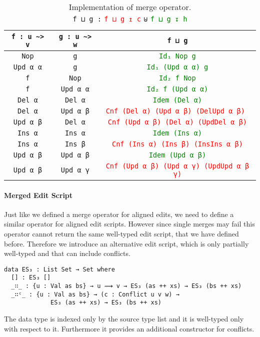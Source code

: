 \documentclass[preprint]{sigplanconf}
\theoremstyle{plain}
\begin{document}
	\begin{table*}[t]
	\centering
	\begin{tabular}{| c | c | c |}
	\hline
	\texttt{f : u \textasciitilde> v} & \texttt{g : u \textasciitilde> w} &  \texttt{f ⊔ g} 
	\\ \hline
	\texttt{Nop} & \texttt{g} & \textcolor{Green}{\texttt{Id₁ Nop g}} 
	\\ \hline
	\texttt{Upd α α} & \texttt{g} & \textcolor{Green}{\texttt{Id₁ (Upd α α) g}} 
	\\ \hline
	\texttt{f} & \texttt{Nop} & \textcolor{Green}{\texttt{Id₂ f Nop}} 
	\\ \hline
	\texttt{f} & \texttt{Upd α α} & \textcolor{Green}{\texttt{Id₂ f (Upd α α)}} 
	\\ \hline
	\texttt{Del α} & \texttt{Del α} & \textcolor{Green}{\texttt{Idem (Del α)}}
	\\ \hline
	\texttt{Del α} & \texttt{Upd α β} & \textcolor{Red}{\texttt{Cnf (Del α) (Upd α β) (DelUpd α β) }}
	\\ \hline
	\texttt{Upd α β} & \texttt{Del α} & \textcolor{Red}{\texttt{Cnf (Upd α β) (Del α) (UpdDel α β)}}
	\\ \hline
	\texttt{Ins α} & \texttt{Ins α} & \textcolor{Green}{\texttt{Idem (Ins α)}} 
	\\	\hline
	\texttt{Ins α} & \texttt{Ins β} & \textcolor{Red}{\texttt{Cnf (Ins α) (Ins β) (InsIns α β)}}
	\\	\hline
	\texttt{Upd α β} & \texttt{Upd α β} & \textcolor{Green}{\texttt{Idem (Upd α β)}}
	\\	\hline
	\texttt{Upd α β} & \texttt{Upd α γ} & \textcolor{Red}{\texttt{Cnf (Upd α β) (Upd α γ) (UpdUpd α β γ)}}
	\\ \hline
	\end{tabular}
	
	\captionsetup{singlelinecheck=false, justification=centering}

	\caption{Implementation of merge operator. \\
	 \texttt{f ⊔ g :} \textcolor{Red}{\texttt{f ⊔ g ↥ c}} \texttt{⊎} \textcolor{Green}{\texttt{f ⊔ g ↧ h}}}	 
	\label{table:merge}
	\end{table*}

	\paragraph{Merged Edit Script}
	Just like we defined a merge operator for aligned edits, we need to 
	define a similar operator for aligned edit scripts.
	However since single merges may fail this operator cannot return 
	the same well-typed edit script, that we have defined before.
	Therefore we introduce an alternative edit script, which is only partially 
	well-typed and that can include conflicts.
\begin{verbatim}
data ES₃ : List Set → Set where
  [] : ES₃ []
  _∷_ : {u : Val as bs} → u ⟿ v → ES₃ (as ++ xs) → ES₃ (bs ++ xs)
  _∷ᶜ_ : {u : Val as bs} → (c : Conflict u v w) → 
             ES₃ (as ++ xs) → ES₃ (bs ++ xs)
\end{verbatim}
	The data type is indexed only by the source type list and it is well-typed
	only with respect to it. Furthermore it provides an additional constructor
	for conflicts. 
\end{document}
